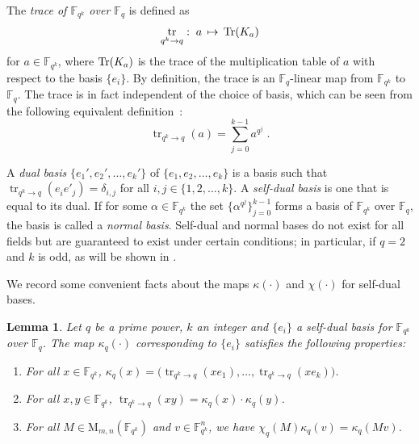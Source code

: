 \documentclass[11pt]{article}
\newtheorem{lemma}[theorem]{Lemma}
\theoremstyle{definition}
\newcommand{\Tr}{\mbox{\rm Tr}}
\newcommand{\F}{\ensuremath{\mathbb{F}}}
\newcommand{\Fq}{\F_q}
\newcommand{\downsize}{\kappa}
\newcommand{\downsizem}{\chi}
\DeclareMathOperator{\tr}{tr}
\newcommand{\Matrix}{\mathrm{M}}
\begin{document}
The \emph{trace of\/ $\F_{q^k}$ over\/ $\Fq$} is defined as
\begin{equation}\label{eq:def-trace}
  \tr_{q^k \to q} :\; a \,\mapsto \, \Tr(K_a)
\end{equation}
for $a \in \F_{q^k}$, where $\Tr(K_a)$ is the trace of the multiplication table
of $a$ with respect to the basis $\{e_i\}$.
By definition, the trace is an $\Fq$-linear map from $\F_{q^k}$ to
$\Fq$. The trace is in fact independent of the choice of basis, which
can be seen from the following equivalent definition~\cite[Definition 2.1.80]{mullen2013handbook}:
\[
	\tr_{q^k \to q}(a) = \sum_{j = 0}^{k-1} a^{q^j}\;.
\]

A \emph{dual basis} $\{e_1', e_2', \ldots, e_k' \}$ of $\{e_1, e_2, \ldots,
e_k\}$ is a basis such that $\tr_{q^k \to q}(e^{}_i e'_j) = \delta_{i,j}$ for
all $i, j \in \{1, 2, \ldots, k\}$.
A \emph{self-dual basis} is one that is equal to its dual.
If for some $\alpha \in \F_{q^k}$ the set $\{ \alpha^{q^j} \}_{j=0}^{k-1}$ forms a
basis of $\F_{q^k}$ over $\Fq$, the basis is called a \emph{normal
  basis}. Self-dual and normal bases do not exist for all fields but are guaranteed to exist under
certain conditions; in particular, if $q = 2$ and $k$ is odd, as will
be shown in .

We record some convenient facts about the maps $\downsize(\cdot)$ and
$\downsizem(\cdot)$ for self-dual bases.

\begin{lemma}
  \label{lem:downsize_field}
  Let $q$ be a prime power, $k$ an integer and $\{e_i\}$ a self-dual basis for
  $\F_{q^k}$ over $\F_q$.
  The map $\downsize_q(\cdot)$ corresponding to $\{e_i\}$ satisfies the
  following properties:
  \begin{enumerate}
  \item For all $x \in \F_{q^k}$, $\downsize_q(x) = \bigl( \tr_{q^k \to
      q}(xe_1),\ldots,\tr_{q^k \to q}(xe_k) \bigr)$.
  \item For all $x,y \in \F_{q^k}$, $\tr_{q^k \to q}(xy) = \downsize_q(x) \cdot
    \downsize_q(y)$.
  \item For all $M \in \Matrix_{m, n}(\F_{q^k})$ and $v \in
    \F_{q^k}^n$, we have $\downsizem_q(M) \downsize_q(v) = \downsize_q(Mv)$.
  \end{enumerate}
\end{lemma}
 
\end{document}
